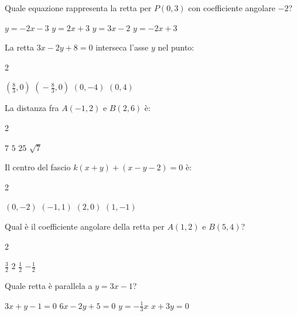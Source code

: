 \documentclass[a4paper,10pt]{exam}
\begin{document}
\vspace{2mm}
\begin{questions}
\question Quale equazione rappresenta la retta per $P(0,3)$ con coefficiente angolare $-2$?
\vspace{0.2em}
\begin{choices}
\choice $y=-2x-3$
\choice $y=2x+3$
\choice $y=3x-2$
\choice $y=-2x+3$
\end{choices}

\question La retta $3x-2y+8=0$ interseca l'asse $y$ nel punto:
\vspace{0.2em}
\begin{multicols}{2}
\begin{choices}
\choice $(\frac83,0)$
\choice $(\!-\frac83,0)$
\choice $(0,-4)$
\choice $(0,4)$
\end{choices}
\end{multicols}

\question La distanza fra $A(-1,2)$ e $B(2,6)$ è:
\vspace{0.2em}
\begin{multicols}{2}
\begin{choices}
\choice $7$
\choice $5$
\choice $25$
\choice $\sqrt{7}$
\end{choices}
\end{multicols}

\question Il centro del fascio $k(x+y)+(x-y-2)=0$ è:
\vspace{0.2em}
\begin{multicols}{2}
\begin{choices}
\choice $(0,-2)$
\choice $(-1,1)$
\choice $(2,0)$
\choice $(1,-1)$
\end{choices}
\end{multicols}

\question Qual è il coefficiente angolare della retta per $A(1,2)$ e $B(5,4)$?
\vspace{0.2em}
\begin{multicols}{2}
\begin{choices}
\choice $\frac32$
\choice $2$
\choice $\frac12$
\choice $-\frac12$
\end{choices}
\end{multicols}

\question Quale retta è parallela a $y=3x-1$?
\vspace{0.2em}
\begin{choices}
\choice $3x+y-1=0$
\choice $6x-2y+5=0$
\choice $y=-\frac13x$
\choice $x+3y=0$
\end{choices}


\end{questions}
\end{document}
